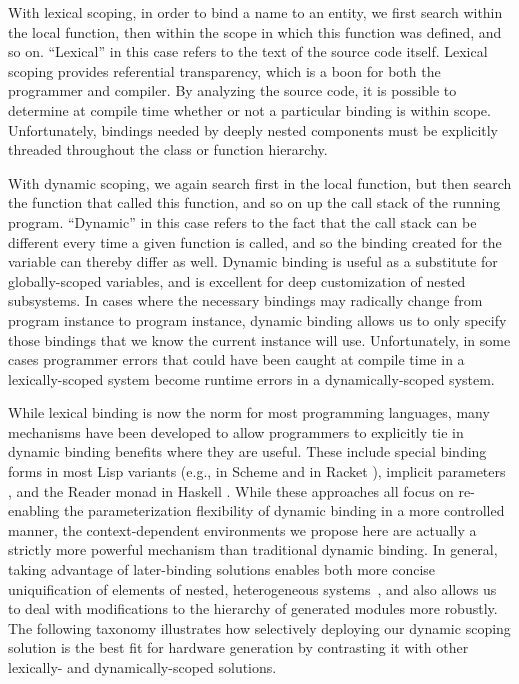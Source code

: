 With lexical scoping, in order to bind a name to an entity, we first search within the local function, then within the scope in which this function was defined, and so on.
``Lexical'' in this case refers to the text of the source code itself.
Lexical scoping provides referential transparency, which is a boon for both the programmer and compiler.
By analyzing the source code, it is possible to determine at compile time whether or not a particular binding is within scope.
Unfortunately, bindings needed by deeply nested components must be explicitly threaded throughout the class or function hierarchy.

With dynamic scoping, we again search first in the local function, but then search the function that called this function, and so on up the call stack of the running program.
``Dynamic'' in this case refers to the fact that the call stack can be different every time a given function is called, and so the binding created for the variable can thereby differ as well.
Dynamic binding is useful as a substitute for globally-scoped variables, and is excellent for deep customization of nested subsystems.
In cases where the necessary bindings may radically change from program instance to program instance, dynamic binding allows us to only specify those bindings that we know the current instance will use.
Unfortunately, in some cases programmer errors that could have been caught at compile time in a lexically-scoped system become runtime errors in a dynamically-scoped system.

While lexical binding is now the norm for most programming languages, many mechanisms have been developed to allow programmers to explicitly tie in dynamic binding benefits where they are useful.
These include special binding forms in most Lisp variants
(e.g.,  in Scheme \cite{steele} and  in Racket \cite{flatt2013racket}),
implicit parameters \cite{lewis2000implicit}, and the Reader monad in Haskell \cite{jones1995functional}.
While these approaches all focus on re-enabling the parameterization flexibility of dynamic binding in a more controlled manner, 
the context-dependent environments we propose here are actually a strictly more powerful mechanism than traditional dynamic binding. 
In general, taking advantage of later-binding solutions enables both more concise uniquification of elements of nested, heterogeneous systems~\cite{shacham2011chip},
and also allows us to deal with modifications to the hierarchy of generated modules more robustly.
The following taxonomy illustrates how selectively deploying our dynamic scoping solution is the best fit for hardware generation
by contrasting it with other lexically- and dynamically-scoped solutions.

